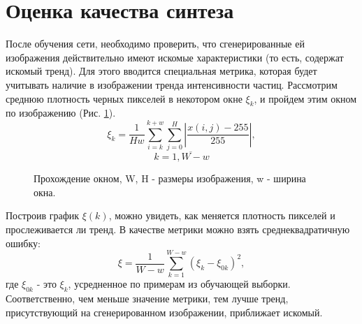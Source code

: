\section{Оценка качества синтеза}
	После обучения сети, необходимо проверить, что сгенерированные ей изображения действительно имеют искомые характеристики (то есть, содержат искомый тренд). Для этого вводится специальная метрика, которая будет учитывать наличие в изображении тренда интенсивности частиц. Рассмотрим среднюю плотность черных пикселей в некотором окне $\xi_k$, и пройдем этим окном по изображению (Рис. \ref{7-window}).
	$$\xi_k = \frac{1}{H w}{\sum_{i=k}^{k+w} \sum_{j=0}^{H}\left| \frac{x(i, j) - 255}{255} \right|}, $$$$k = \overline{1, W - w} $$
	\begin{figure}[h]
		\caption{Прохождение окном, W, H - размеры изображения, w - ширина окна.}
		\label{7-window}
	\end{figure}
	
	Построив график $\xi(k)$, можно увидеть, как меняется плотность пикселей и прослеживается ли тренд. В качестве метрики можно взять среднеквадратичную ошибку:
	$$ \xi = \frac{1}{W-w}\sum_{k=1}^{W-w} (\xi_k - \xi_{0k})^2,$$
	где $\xi_{0k}$ - это $\xi_k$, усредненное по примерам из обучающей выборки. Соответственно, чем меньше значение метрики, тем лучше тренд, присутствующий на сгенерированном изображении, приближает искомый.